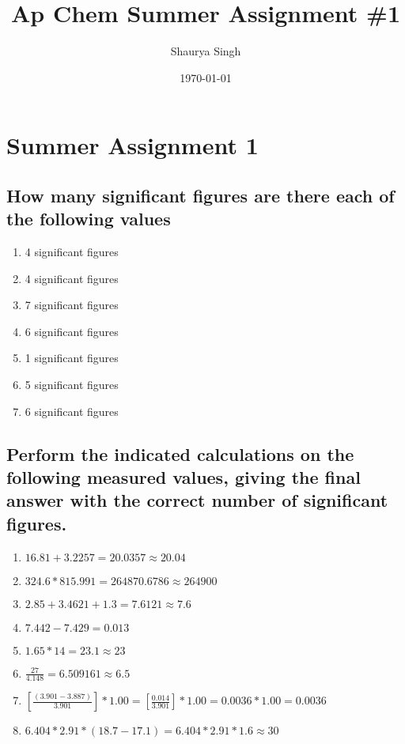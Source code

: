 \documentclass[11pt]{article}
\author{Shaurya Singh}
\date{\today}
\title{Ap Chem Summer Assignment \#1}
\begin{document}
\maketitle

\section{Summer Assignment 1}
\label{sec:orgaf382f2}
\subsection{How many significant figures are there each of the following values}
\label{sec:org35d85c0}
\begin{enumerate}
\item 4 significant figures
\item 4 significant figures
\item 7 significant figures
\item 6 significant figures
\item 1 significant figures
\item 5 significant figures
\item 6 significant figures
\end{enumerate}

\subsection{Perform the indicated calculations on the following measured values, giving the final answer with the correct number of significant figures.}
\label{sec:org6f8e3ff}
\begin{enumerate}
\item \(16.81 + 3.2257 = 20.0357 \approx 20.04\)
\item \(324.6 * 815.991 = 264870.6786 \approx 264900\)
\item \(2.85 + 3.4621 + 1.3 = 7.6121 \approx 7.6\)
\item \(7.442 - 7.429 = 0.013\)
\item \(1.65 * 14 = 23.1 \approx 23\)
\item \(\frac{27}{4.148} = 6.509161 \approx 6.5\)
\item \([\frac{(3.901 - 3.887)}{3.901}] * 1.00 = [\frac{0.014}{3.901}] * 1.00 = 0.0036 * 1.00 = 0.0036\)
\item \(6.404 * 2.91 * (18.7 - 17.1) = 6.404 * 2.91 * 1.6 \approx 30\)
\end{enumerate}
\end{document}
